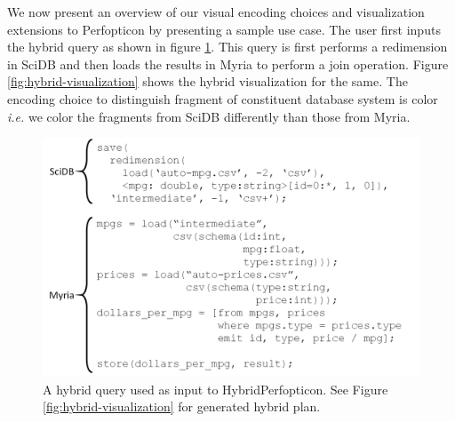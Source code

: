 \documentclass{chi2009}
\newcommand{\ie}{{\em i.e.} }
\begin{document}
We now present an overview of our visual encoding choices and visualization extensions to Perfopticon by presenting a sample use case. The user first inputs the hybrid query as shown in figure \ref{fig:hybrid-plan}. This query is first performs a redimension in SciDB and then loads the results in Myria to perform a join operation. Figure \ref{fig:hybrid-visualization} shows the hybrid visualization for the same. The encoding choice to distinguish fragment of constituent database system is color \ie we color the fragments from SciDB differently than those from Myria.


\begin{figure}[h]
\begin{center}
\includegraphics[scale=0.17]{visualization-query.png}
\end{center}
\caption{A hybrid query used as input to HybridPerfopticon.  See Figure \ref{fig:hybrid-visualization} for generated hybrid plan.}
\label{fig:hybrid-plan}
\end{figure}
\end{document}
